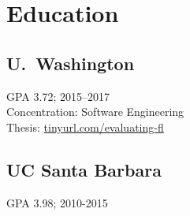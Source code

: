 \section{Education}

\subsection{U.~Washington}
GPA 3.72; 2015--2017 \\
Concentration: Software Engineering \\
Thesis: \href{http://tinyurl.com/evaluating-fl}{tinyurl.com/evaluating-fl}
\sectionsep

\subsection{UC Santa Barbara}
GPA 3.98; 2010-2015
\sectionsep
